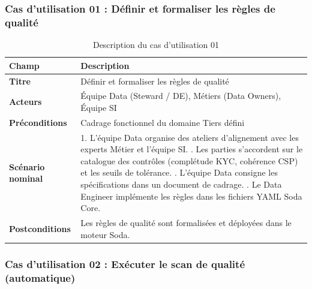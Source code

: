 \subsubsection{Cas d'utilisation 01 : Définir et formaliser les règles de qualité}

\begin{table}[H]
\centering
\caption{Description du cas d'utilisation 01}
\label{tab:uc01}
\renewcommand{\arraystretch}{1.4}
\begin{tabular}{|l|p{10cm}|}
\hline
\rowcolor{gray!20}
\textbf{Champ} & \textbf{Description} \\
\hline
\textbf{Titre} & Définir et formaliser les règles de qualité \\
\hline
\textbf{Acteurs} & Équipe Data (Steward / DE), Métiers (Data Owners), Équipe SI \\
\hline
\textbf{Préconditions} & Cadrage fonctionnel du domaine Tiers défini \\
\hline
\textbf{Scénario nominal} &
1. L'équipe Data organise des ateliers d'alignement avec les experts Métier et l'équipe SI. \newline
2. Les parties s'accordent sur le catalogue des contrôles (complétude KYC, cohérence CSP) et les seuils de tolérance. \newline
3. L'équipe Data consigne les spécifications dans un document de cadrage. \newline
4. Le Data Engineer implémente les règles dans les fichiers YAML Soda Core. \\
\hline
\textbf{Postconditions} & Les règles de qualité sont formalisées et déployées dans le moteur Soda. \\
\hline
\end{tabular}
\end{table}

\subsubsection{Cas d'utilisation 02 : Exécuter le scan de qualité (automatique)}

